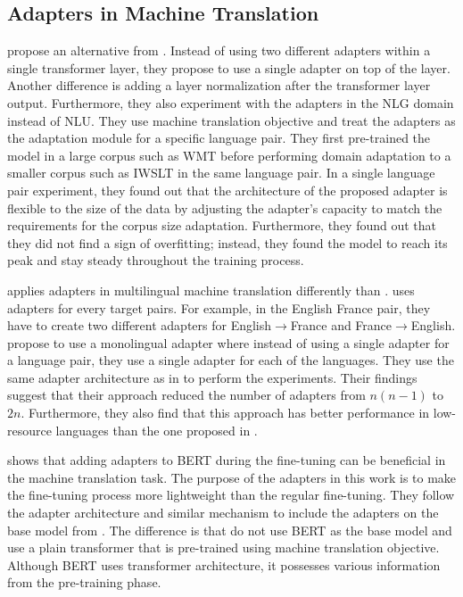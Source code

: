 \subsection{Adapters in Machine Translation}
\label{sec:app_mt}
\cite{bapna2019simple} propose an alternative from \cite{houlsby2019parameter}. Instead of using two different adapters within a single transformer layer, they propose to use a single adapter on top of the layer. Another difference is adding a layer normalization after the transformer layer output. Furthermore, they also experiment with the adapters in the NLG domain instead of NLU. They use machine translation objective and treat the adapters as the adaptation module for a specific language pair. They first pre-trained the model in a large corpus such as WMT before performing domain adaptation to a smaller corpus such as IWSLT in the same language pair. In a single language pair experiment, they found out that the architecture of the proposed adapter is flexible to the size of the data by adjusting the adapter's capacity to match the requirements for the corpus size adaptation. Furthermore, they found out that they did not find a sign of overfitting; instead, they found the model to reach its peak and stay steady throughout the training process.

\cite{philip2020monolingual} applies adapters in multilingual machine translation differently than \cite{bapna2019simple}. \cite{bapna2019simple} uses adapters for every target pairs. For example, in the English France pair, they have to create two different adapters for English$\rightarrow$France and France$\rightarrow$English. \cite{philip2020monolingual} propose to use a monolingual adapter where instead of using a single adapter for a language pair, they use a single adapter for each of the languages. They use the same adapter architecture as in \cite{bapna2019simple} to perform the experiments. Their findings suggest that their approach reduced the number of adapters from $n(n-1)$ to $2n$. Furthermore, they also find that this approach has better performance in low-resource languages than the one proposed in \cite{bapna2019simple}.

\cite{guo2021adaptive} shows that adding adapters to BERT during the fine-tuning can be beneficial in the machine translation task. The purpose of the adapters in this work is to make the fine-tuning process more lightweight than the regular fine-tuning. They follow the adapter architecture and similar mechanism to include the adapters on the base model from \cite{bapna2019simple}. The difference is that \cite{bapna2019simple} do not use BERT as the base model and use a plain transformer that is pre-trained using machine translation objective. Although BERT uses transformer architecture, it possesses various information from the pre-training phase.



